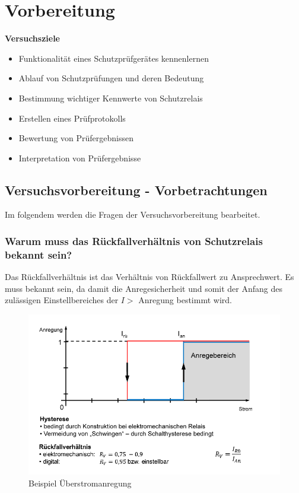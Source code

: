 \chapter{Vorbereitung}
\textbf{Versuchsziele}
\begin{itemize}[noitemsep]
	
	\item Funktionalität eines Schutzprüfgerätes kennenlernen
	\item Ablauf von Schutzprüfungen und deren Bedeutung
	\item Bestimmung wichtiger Kennwerte von Schutzrelais
	\item Erstellen eines Prüfprotokolls
	\item Bewertung von Prüfergebnissen
	\item Interpretation von Prüfergebnisse
\end{itemize}

\section{Versuchsvorbereitung - Vorbetrachtungen}
Im folgendem werden die Fragen der Versuchsvorbereitung bearbeitet.

\subsection{Warum muss das Rückfallverhältnis von Schutzrelais bekannt sein?}

Das Rückfallverhältnis ist das Verhältnis von Rückfallwert zu Ansprechwert. Es muss bekannt sein, da damit die Anregesicherheit und somit der Anfang des zulässigen Einstellbereiches der $I>$ Anregung bestimmt wird.

\begin{figure}
	\centering
	\includegraphics[width=0.7\linewidth]{figures/anregung}
	\caption{Beispiel Überstromanregung}
	\label{fig:anregung}
\end{figure}


